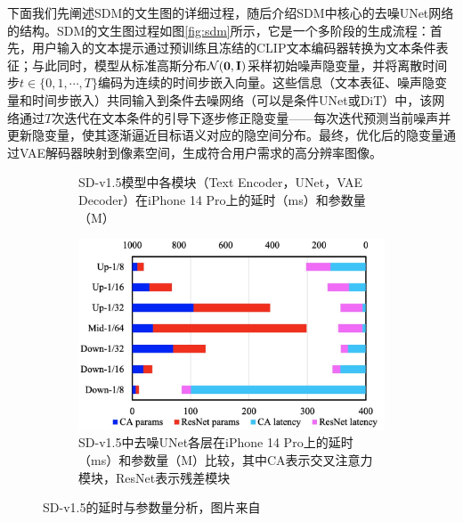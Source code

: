 \documentclass[11pt,a4paper,UTF8]{ctexart}
\begin{document}
下面我们先阐述SDM的文生图的详细过程，随后介绍SDM中核心的去噪UNet网络的结构。SDM的文生图过程如图\ref{fig:sdm}所示，它是一个多阶段的生成流程：首先，用户输入的文本提示通过预训练且冻结的CLIP文本编码器转换为文本条件表征；与此同时，模型从标准高斯分布$\mathcal{N}(\mathbf{0},\mathbf{I})$采样初始噪声隐变量，并将离散时间步$t\in\{0,1,\cdots,T\}$编码为连续的时间步嵌入向量。这些信息（文本表征、噪声隐变量和时间步嵌入）共同输入到条件去噪网络（可以是条件UNet或DiT）中，该网络通过$T$次迭代在文本条件的引导下逐步修正隐变量——每次迭代预测当前噪声并更新隐变量，使其逐渐逼近目标语义对应的隐空间分布。最终，优化后的隐变量通过VAE解码器映射到像素空间，生成符合用户需求的高分辨率图像。

\begin{figure}[htbp]
    \centering
    \begin{subfigure}[b]{0.49\textwidth}
        \centering
        \caption{SD-v1.5模型中各模块（Text Encoder，UNet，VAE Decoder）在iPhone 14 Pro上的延时（ms）和参数量（M）}
        \label{fig:latency_three}
    \end{subfigure}
    \hfill
    \begin{subfigure}[b]{0.49\textwidth}
        \centering
        \includegraphics[width=\linewidth]{img/unet_latency_params.jpg}
        \caption{SD-v1.5中去噪UNet各层在iPhone 14 Pro上的延时（ms）和参数量（M）比较，其中CA表示交叉注意力模块，ResNet表示残差模块}
        \label{fig:latency_params_unet}
    \end{subfigure}
    \caption{SD-v1.5的延时与参数量分析，图片来自\cite{li2023snapfusion}}
    \label{fig:sd_v15}
\end{figure}
\end{document}
